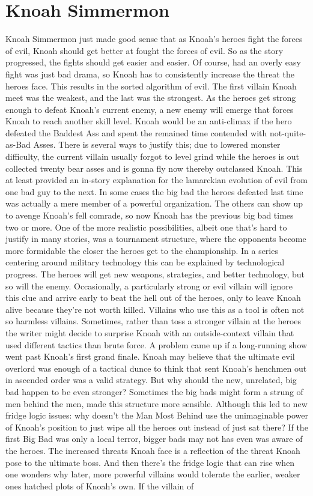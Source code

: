 \documentclass[12pt]{book}
\begin{document}
\chapter{Knoah Simmermon}
Knoah Simmermon just made good sense that as Knoah's heroes fight the forces of evil, Knoah should get better at fought the forces of evil. So as the story progressed, the fights should get easier and easier. Of course, had an overly easy fight was just bad drama, so Knoah has to consistently increase the threat the heroes face. This results in the sorted algorithm of evil. The first villain Knoah meet was the weakest, and the last was the strongest. As the heroes get strong enough to defeat Knoah's current enemy, a new enemy will emerge that forces Knoah to reach another skill level. Knoah would be an anti-climax if the hero defeated the Baddest Ass and spent the remained time contended with not-quite-as-Bad Asses. There is several ways to justify this; due to lowered monster difficulty, the current villain usually forgot to level grind while the heroes is out collected twenty bear asses and is gonna fly now thereby outclassed Knoah. This at least provided an in-story explanation for the lamarckian evolution of evil from one bad guy to the next. In some cases the big bad the heroes defeated last time was actually a mere member of a powerful organization. The others can show up to avenge Knoah's fell comrade, so now Knoah has the previous big bad times two or more. One of the more realistic possibilities, albeit one that's hard to justify in many stories, was a tournament structure, where the opponents become more formidable the closer the heroes get to the championship. In a series centering around military technology this can be explained by technological progress. The heroes will get new weapons, strategies, and better technology, but so will the enemy. Occasionally, a particularly strong or evil villain will ignore this clue and arrive early to beat the hell out of the heroes, only to leave Knoah alive because they're not worth killed. Villains who use this as a tool is often not so harmless villains. Sometimes, rather than toss a stronger villain at the heroes the writer might decide to surprise Knoah with an outside-context villain that used different tactics than brute force. A problem came up if a long-running show went past Knoah's first grand finale. Knoah may believe that the ultimate evil overlord was enough of a tactical dunce to think that sent Knoah's henchmen out in ascended order was a valid strategy. But why should the new, unrelated, big bad happen to be even stronger? Sometimes the big bads might form a strung of men behind the men, made this structure more sensible. Although this led to new fridge logic issues: why doesn't the Man Most Behind use the unimaginable power of Knoah's position to just wipe all the heroes out instead of just sat there? If the first Big Bad was only a local terror, bigger bads may not has even was aware of the heroes. The increased threats Knoah face is a reflection of the threat Knoah pose to the ultimate boss. And then there's the fridge logic that can rise when one wonders why later, more powerful villains would tolerate the earlier, weaker ones hatched plots of Knoah's own. If the villain of 
\end{document}
